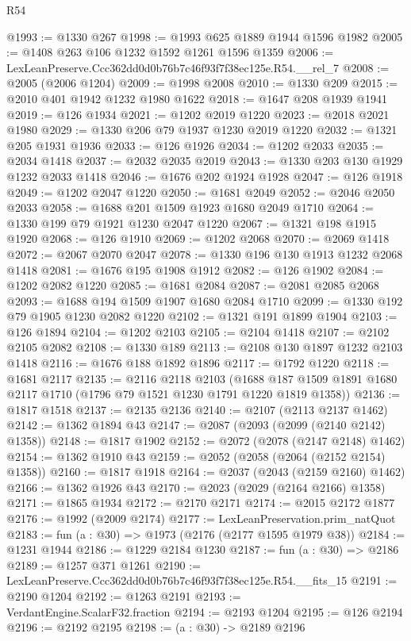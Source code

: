 \begin{lexlean}{R54}
\begin{coremodule}
@1993 := @1330 @267
@1998 := @1993 @625 @1889 @1944 @1596 @1982
@2005 := @1408 @263 @106 @1232 @1592 @1261 @1596 @1359
@2006 := LexLeanPreserve.Ccc362dd0d0b76b7c46f93f7f38ec125e.R54.__rel_7
@2008 := @2005 (@2006 @1204)
@2009 := @1998 @2008
@2010 := @1330 @209
@2015 := @2010 @401 @1942 @1232 @1980 @1622
@2018 := @1647 @208 @1939 @1941
@2019 := @126 @1934
@2021 := @1202 @2019 @1220
@2023 := @2018 @2021 @1980
@2029 := @1330 @206 @79 @1937 @1230 @2019 @1220
@2032 := @1321 @205 @1931 @1936
@2033 := @126 @1926
@2034 := @1202 @2033
@2035 := @2034 @1418
@2037 := @2032 @2035 @2019
@2043 := @1330 @203 @130 @1929 @1232 @2033 @1418
@2046 := @1676 @202 @1924 @1928
@2047 := @126 @1918
@2049 := @1202 @2047 @1220
@2050 := @1681 @2049
@2052 := @2046 @2050 @2033
@2058 := @1688 @201 @1509 @1923 @1680 @2049 @1710
@2064 := @1330 @199 @79 @1921 @1230 @2047 @1220
@2067 := @1321 @198 @1915 @1920
@2068 := @126 @1910
@2069 := @1202 @2068
@2070 := @2069 @1418
@2072 := @2067 @2070 @2047
@2078 := @1330 @196 @130 @1913 @1232 @2068 @1418
@2081 := @1676 @195 @1908 @1912
@2082 := @126 @1902
@2084 := @1202 @2082 @1220
@2085 := @1681 @2084
@2087 := @2081 @2085 @2068
@2093 := @1688 @194 @1509 @1907 @1680 @2084 @1710
@2099 := @1330 @192 @79 @1905 @1230 @2082 @1220
@2102 := @1321 @191 @1899 @1904
@2103 := @126 @1894
@2104 := @1202 @2103
@2105 := @2104 @1418
@2107 := @2102 @2105 @2082
@2108 := @1330 @189
@2113 := @2108 @130 @1897 @1232 @2103 @1418
@2116 := @1676 @188 @1892 @1896
@2117 := @1792 @1220
@2118 := @1681 @2117
@2135 := @2116
    @2118
    @2103
    (@1688 @187 @1509 @1891 @1680 @2117 @1710 (@1796 @79 @1521 @1230 @1791 @1220 @1819 @1358))
@2136 := @1817 @1518
@2137 := @2135 @2136
@2140 := @2107 (@2113 @2137 @1462)
@2142 := @1362 @1894 @43
@2147 := @2087 (@2093 (@2099 (@2140 @2142) @1358))
@2148 := @1817 @1902
@2152 := @2072 (@2078 (@2147 @2148) @1462)
@2154 := @1362 @1910 @43
@2159 := @2052 (@2058 (@2064 (@2152 @2154) @1358))
@2160 := @1817 @1918
@2164 := @2037 (@2043 (@2159 @2160) @1462)
@2166 := @1362 @1926 @43
@2170 := @2023 (@2029 (@2164 @2166) @1358)
@2171 := @1865 @1934
@2172 := @2170 @2171
@2174 := @2015 @2172 @1877
@2176 := @1992 (@2009 @2174)
@2177 := LexLeanPreservation.prim_natQuot
@2183 := fun (a : @30) => @1973 (@2176 (@2177 @1595 @1979 @38))
@2184 := @1231 @1944
@2186 := @1229 @2184 @1230
@2187 := fun (a : @30) => @2186
@2189 := @1257 @371 @1261
@2190 := LexLeanPreserve.Ccc362dd0d0b76b7c46f93f7f38ec125e.R54.__fits_15
@2191 := @2190 @1204
@2192 := @1263 @2191
@2193 := VerdantEngine.ScalarF32.fraction
@2194 := @2193 @1204
@2195 := @126 @2194
@2196 := @2192 @2195
@2198 := (a : @30) -> @2189 @2196

\end{coremodule}
\end{lexlean}
